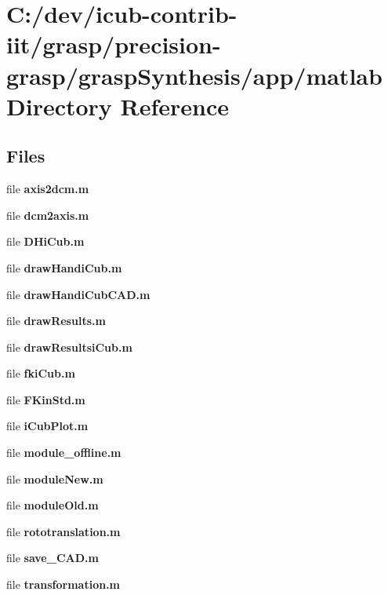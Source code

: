 \section{C\+:/dev/icub-\/contrib-\/iit/grasp/precision-\/grasp/grasp\+Synthesis/app/matlab Directory Reference}
\label{dir_612017fa4f4163be5376787ce7e7dfb4}
\subsection*{Files}
\begin{DoxyCompactItemize}
\item 
file {\bfseries axis2dcm.\+m}
\item 
file {\bfseries dcm2axis.\+m}
\item 
file {\bfseries D\+Hi\+Cub.\+m}
\item 
file {\bfseries draw\+Handi\+Cub.\+m}
\item 
file {\bfseries draw\+Handi\+Cub\+C\+A\+D.\+m}
\item 
file {\bfseries draw\+Results.\+m}
\item 
file {\bfseries draw\+Resultsi\+Cub.\+m}
\item 
file {\bfseries fki\+Cub.\+m}
\item 
file {\bfseries F\+Kin\+Std.\+m}
\item 
file {\bfseries i\+Cub\+Plot.\+m}
\item 
file {\bfseries module\+\_\+offline.\+m}
\item 
file {\bfseries module\+New.\+m}
\item 
file {\bfseries module\+Old.\+m}
\item 
file {\bfseries rototranslation.\+m}
\item 
file {\bfseries save\+\_\+\+C\+A\+D.\+m}
\item 
file {\bfseries transformation.\+m}
\end{DoxyCompactItemize}
